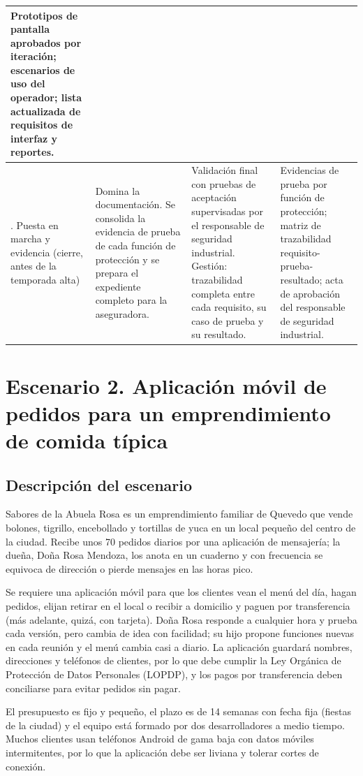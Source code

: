 \documentclass[12pt,a4paper]{article}
\begin{document}
\begin{longtable}{>{\raggedright\arraybackslash}p{2.0cm} >{\raggedright\arraybackslash}p{4.0cm} >{\raggedright\arraybackslash}p{4.0cm} >{\raggedright\arraybackslash}p{4.0cm}}
Prototipos de pantalla aprobados por iteración; escenarios de uso del operador; lista actualizada de requisitos de interfaz y reportes. \\
\midrule
4. Puesta en marcha y evidencia (cierre, antes de la temporada alta) &
Domina la documentación. Se consolida la evidencia de prueba de cada función de protección y se prepara el expediente completo para la aseguradora. &
Validación final con pruebas de aceptación supervisadas por el responsable de seguridad industrial. Gestión: trazabilidad completa entre cada requisito, su caso de prueba y su resultado. &
Evidencias de prueba por función de protección; matriz de trazabilidad requisito-prueba-resultado; acta de aprobación del responsable de seguridad industrial. \\
\bottomrule
\end{longtable}
\endgroup



\section{Escenario 2. Aplicación móvil de pedidos para un emprendimiento de comida típica}

\subsection{Descripción del escenario}

Sabores de la Abuela Rosa es un emprendimiento familiar de Quevedo que vende
bolones, tigrillo, encebollado y tortillas de yuca en un local pequeño del
centro de la ciudad. Recibe unos 70 pedidos diarios por una aplicación de
mensajería; la dueña, Doña Rosa Mendoza, los anota en un cuaderno y con
frecuencia se equivoca de dirección o pierde mensajes en las horas pico.

Se requiere una aplicación móvil para que los clientes vean el menú del día,
hagan pedidos, elijan retirar en el local o recibir a domicilio y paguen por
transferencia (más adelante, quizá, con tarjeta). Doña Rosa responde a
cualquier hora y prueba cada versión, pero cambia de idea con facilidad; su
hijo propone funciones nuevas en cada reunión y el menú cambia casi a diario.
La aplicación guardará nombres, direcciones y teléfonos de clientes, por lo
que debe cumplir la Ley Orgánica de Protección de Datos Personales (LOPDP), y
los pagos por transferencia deben conciliarse para evitar pedidos sin pagar.

El presupuesto es fijo y pequeño, el plazo es de 14 semanas con fecha fija
(fiestas de la ciudad) y el equipo está formado por dos desarrolladores a
medio tiempo. Muchos clientes usan teléfonos Android de gama baja con datos
móviles intermitentes, por lo que la aplicación debe ser liviana y tolerar
cortes de conexión.
\end{document}
